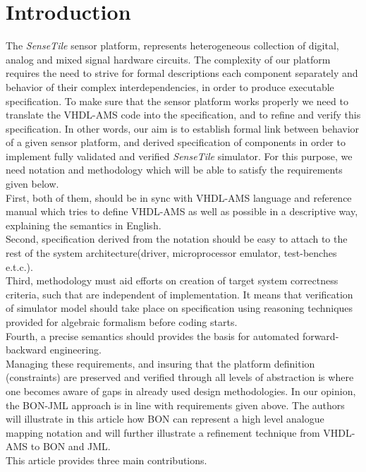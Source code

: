 \documentclass{article}
\newcommand{\ST}{\emph{SenseTile}\xspace}
\begin{document}
\section{Introduction}
\label{sec:introduction}
The \ST sensor platform, represents heterogeneous 
collection of digital, analog and mixed signal hardware circuits. 
The complexity of our platform requires the need to strive for formal 
descriptions each component separately and  behavior of their 
complex interdependencies, in order to produce executable specification.
To make sure that the sensor platform works properly we need 
to translate the VHDL-AMS code into the specification, and to refine and 
verify this specification.
In other words, our aim is to establish formal link between behavior of a given 
sensor platform, and derived specification of components  in order to implement 
fully validated and verified \ST simulator.
For this purpose, we need notation and methodology 
which will be able to satisfy the requirements given below.\\ 
First, both of them, should be in sync with  VHDL-AMS language and reference 
manual which tries to define VHDL-AMS as well as possible in a descriptive way,
explaining the semantics in English.\\
Second, specification derived from the notation should  be easy to attach to 
the rest of the system architecture\xspace(driver, microprocessor emulator, 
test-benches e.t.c.).\\
Third, methodology must aid efforts on creation of target system 
correctness criteria, such that are independent of implementation.
It means that verification of simulator model should take place on specification 
using reasoning techniques provided for algebraic formalism before coding starts.\\
Fourth, a precise semantics should  provides the basis for
automated forward-backward engineering.\\
Managing these requirements, and insuring that the platform definition 
(constraints) are preserved and verified through all levels of 
abstraction is where one becomes aware of gaps in already 
used design methodologies.
In our opinion, the BON-JML approach is in line with requirements given above.
The authors will illustrate in this article how BON can represent a high
level analogue mapping notation and will further illustrate a refinement 
technique from VHDL-AMS to BON and JML.\\
This article provides three main contributions.
\end{document}
